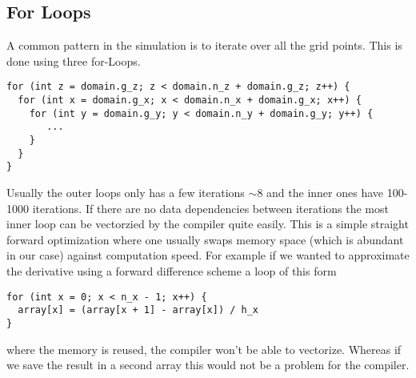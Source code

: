 \documentclass[master.tex]{subfiles}
\begin{document}
\subsection{For Loops}
A common pattern in the simulation is to iterate over all the grid points.
This is done using three for-Loops.
\begin{lstlisting}
for (int z = domain.g_z; z < domain.n_z + domain.g_z; z++) {
  for (int x = domain.g_x; x < domain.n_x + domain.g_x; x++) {
    for (int y = domain.g_y; y < domain.n_y + domain.g_y; y++) {
       ...
    }
  }
}
\end{lstlisting}
Usually the outer loops only has a few iterations $\sim 8$ and the inner ones have 100-1000 iterations.
If there are no data dependencies between iterations the most inner loop can be vectorzied by the compiler quite easily. This is a simple straight forward optimization where one usually swaps memory space (which is abundant in our case) against computation speed. For example if we wanted to approximate the derivative using a forward difference scheme a loop of this form
\begin{lstlisting}
for (int x = 0; x < n_x - 1; x++) {
  array[x] = (array[x + 1] - array[x]) / h_x    
}
\end{lstlisting}
where the memory is reused, the compiler won't be able to vectorize. Whereas if we save the result in a second array this would not be a problem for the compiler.
\end{document}
